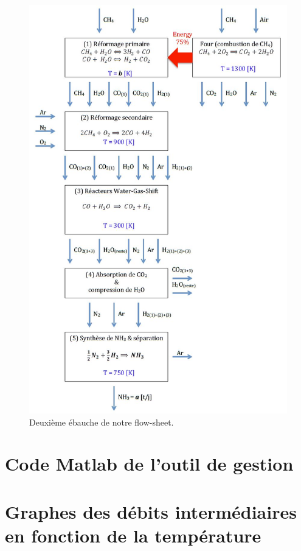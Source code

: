\begin{figure}[htb!]
	\centering
	\includegraphics[scale=0.65]{media/flow-sheet-v2.jpg}
	\caption{Deuxième ébauche de notre flow-sheet.}
	\label{flow-sheet-v2}
\end{figure}
\newpage

\section{Code Matlab de l'outil de gestion}
\label{code-matlab-outil}




\section{Graphes des débits intermédiaires en fonction
de la température}
\label{sec:graphes}

